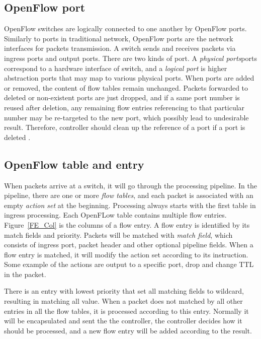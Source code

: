 \subsection{OpenFlow port}
\label{OpenFlow port}
OpenFlow switches are logically connected to one another by OpenFlow ports. Similarly to ports in traditional network, OpenFlow ports are the network interfaces for packets transmission. A switch sends and receives packets via ingress ports and output ports. There are two kinds of port. A \textit{physical ports}ports correspond to a hardware interface of switch, and a \textit{logical port} is higher abstraction ports that may map to various physical ports. When ports are added or removed, the content of flow tables remain unchanged. Packets forwarded to deleted or non-existent ports are just dropped, and if a same port number is reused after deletion, any remaining flow entries referencing to that particular number may be re-targeted to the new port, which possibly lead to undesirable result. Therefore, controller should clean up the reference of a port if a port is deleted \cite{OF_SPEC}. 

\subsection{OpenFlow table and entry}
\label{OpenFlow table and entry}
When packets arrive at a switch, it will go through the processing pipeline. In the pipeline, there are one or more \textit{flow tables}, and each packet is associated with an empty \textit{action set} at the beginning. Processing always starts with the first table in ingress processing. Each OpenFLow table contains multiple flow entries. Figure~\ref{FE_Col} is the columns of a flow entry. A flow entry is identified by its match fields and priority. Packets will be matched with \textit{match field}, which consists of ingress port, packet header and other optional pipeline fields. When a flow entry is matched, it will modify the action set according to its instruction. Some example of the actions are output to a specific port, drop and change TTL in the packet.

There is an entry with lowest priority that set all matching fields to wildcard, resulting in matching all value. When a packet does not matched by all other entries in all the flow tables, it is processed according to this entry. Normally it will be encapsulated and sent the the controller, the controller decides how it should be processed, and a new flow entry will be added according to the result.

